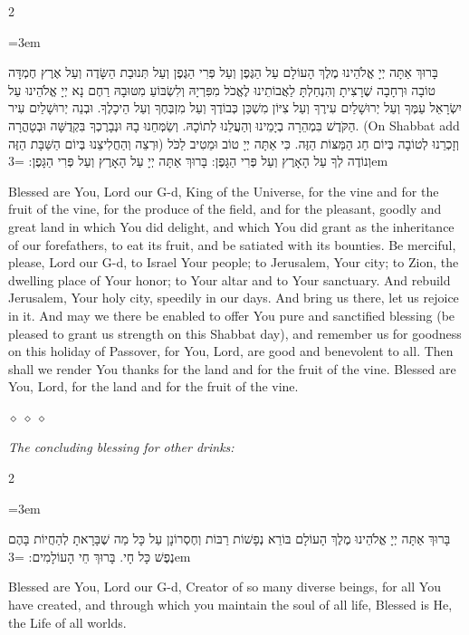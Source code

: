 \documentclass[11pt, openany]{book}
\newcommand{\instruction}[1]{%
  \par\vspace{3pt}
  \begin{tcolorbox}[
    enhanced,
    breakable,
    colback=sederlight,
    colframe=sederlight,
    boxrule=0pt,
    left=10pt,
    right=6pt,
    top=4pt,
    bottom=4pt,
    borderline west={2pt}{0pt}{sederwine!60},
    arc=0pt,
    outer arc=0pt,
  ]
    {\small\itshape\textcolor{sederwine}{#1}}
  \end{tcolorbox}
  \par\vspace{2pt}
}
\newenvironment{bilingual}{%
  \par\vspace{4pt}%
  \begin{paracol}{2}%
}{%
  \end{paracol}%
  \par\vspace{2pt}%
}
\newenvironment{hebrewcol}{%
  \switchcolumn[1]%
  \begingroup
  \RTL
  \hebrewfont\large
  \setstretch{1.4}%
  \emergencystretch=3em
  \tolerance=9999
  \parindent=0pt\relax
}{%
  \endRTL
  \endgroup
}
\newenvironment{englishcol}{%
  \switchcolumn[0]%
  \begingroup
  \setstretch{1.4}%
  \emergencystretch=3em
  \tolerance=9999
  \normalsize
  \rightskip=0.12in\relax
}{%
  \endgroup
}
\newcommand{\parasep}{%
  \par\vspace{3pt}
  \begin{center}
    \textcolor{sedergold!50}{\tiny$\diamond\;\diamond\;\diamond$}
  \end{center}
  \par\vspace{3pt}
}
\begin{document}
\begin{bilingual}
\begin{hebrewcol}
בָּרוּךְ אַתָּה יְיָ אֱלֹהֵינוּ מֶלֶךְ הָעוֹלָם עַל הַגֶּפֶן וְעַל פְּרִי הַגֶּפֶן וְעַל תְּנוּבַת הַשָּׂדֶה וְעַל אֶרֶץ חֶמְדָּה טוֹבָה וּרְחָבָה שֶׁרָצִיתָ וְהִנְחַלְתָּ לַאֲבוֹתֵינוּ לֶאֱכֹל מִפִּרְיָהּ וְלִשְׂבּוֹעַ מִטּוּבָהּ רַחֶם נָא יְיָ אֱלֹהֵינוּ עַל יִשְׂרָאֵל עַמֶּךָ וְעַל יְרוּשָׁלַיִם עִירֶךָ וְעַל צִיּוֹן מִשְׁכַּן כְּבוֹדֶךָ וְעַל מִזְבְּחֶךָ וְעַל הֵיכָלֶךָ. וּבְנֵה יְרוּשָׁלַיִם עִיר הַקֹּדֶשׁ בִּמְהֵרָה בְיָמֵינוּ וְהַעֲלֵנוּ לְתוֹכָהּ. וְשַׂמְּחֵנוּ בָהּ וּנְבָרֶכְךָ בִּקְדֻשָּׁה וּבְטָהֳרָה. (On Shabbat add וּרְצֵה וְהַחֲלִיצֵנוּ בְּיוֹם הַשַּׁבָּת הַזֶּה) וְזָכְרֵנוּ לְטוֹבָה בְּיוֹם חַג הַמַּצּוֹת הַזֶּה. כִּי אַתָּה יְיָ טוֹב וּמֵטִיב לַכֹּל וְנוֹדֶה לְךָ עַל הָאָרֶץ וְעַל פְּרִי הַגָּפֶן: בָּרוּךְ אַתָּה יְיָ עַל הָאָרֶץ וְעַל פְּרִי הַגָּפֶן:
\end{hebrewcol}
\begin{englishcol}
Blessed are You, Lord our G-d, King of the Universe, for the vine and for the fruit of the vine, for the produce of the field, and for the pleasant, goodly and great land in which You did delight, and which You did grant as the inheritance of our forefathers, to eat its fruit, and be satiated with its bounties. Be merciful, please, Lord our G-d, to Israel Your people; to Jerusalem, Your city; to Zion, the dwelling place of Your honor; to Your altar and to Your sanctuary. And rebuild Jerusalem, Your holy city, speedily in our days. And bring us there, let us rejoice in it. And may we there be enabled to offer You pure and sanctified blessing (be pleased to grant us strength on this Shabbat day), and remember us for goodness on this holiday of Passover, for You, Lord, are good and benevolent to all. Then shall we render You thanks for the land and for the fruit of the vine. Blessed are You, Lord, for the land and for the fruit of the vine.
\end{englishcol}
\end{bilingual}
\parasep

\instruction{The concluding blessing for other drinks:}

\begin{bilingual}
\begin{hebrewcol}
בָּרוּךְ אַתָּה יְיָ אֱלֹהֵינוּ מֶלֶךְ הָעוֹלָם בּוֹרֵא נְפָשׁוֹת רַבּוֹת וְחֶסְרוֹנָן עַל כָּל מַה שֶׁבָּרָאתָ לְהַחֲיוֹת בָּהֶם נֶפֶשׁ כָּל חָי. בָּרוּךְ חֵי הָעוֹלָמִים:
\end{hebrewcol}
\begin{englishcol}
Blessed are You, Lord our G-d, Creator of so many diverse beings, for all You have created, and through which you maintain the soul of all life, Blessed is He, the Life of all worlds.
\end{englishcol}
\end{bilingual}
\vspace{10pt}
\begin{center}
\textcolor{sedergold}{}
\end{center}
\vspace{6pt}
\end{document}
